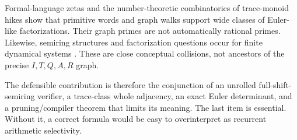 Formal-language zetas \citep{BerstelReutenauer1990} and the number-theoretic
combinatorics of trace-monoid hikes \citep{GiscardRochet2017} show that
primitive words and graph walks support wide classes of Euler-like
factorizations.  Their graph primes are not automatically rational primes.
Likewise, semiring structures and factorization questions occur for finite
dynamical systems \citep{NaquinGadouleau2024}.  These are close conceptual
collisions, not ancestors of the precise $I,T,Q,A,R$ graph.

The defensible contribution is therefore the conjunction of an unrolled
full-shift-semiring verifier, a trace-class whole adjacency, an exact Euler
determinant, and a pruning/compiler theorem that limits its meaning.  The
last item is essential.  Without it, a correct formula would be easy to
overinterpret as recurrent arithmetic selectivity.

